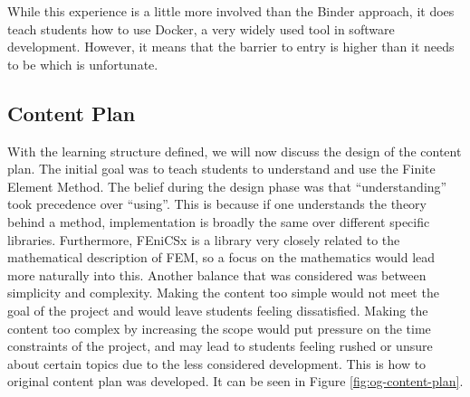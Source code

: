 While this experience is a little more involved than the Binder approach, it does teach students how to use Docker, a very widely used tool in software development. However, it means that the barrier to entry is higher than it needs to be which is unfortunate.

\subsection{Content Plan}


With the learning structure defined, we will now discuss the design of the content plan. The initial goal was to teach students to understand and use the Finite Element Method. The belief during the design phase was that ``understanding'' took precedence over ``using''. This is because if one understands the theory behind a method, implementation is broadly the same over different specific libraries. Furthermore, FEniCSx is a library very closely related to the mathematical description of FEM, so a focus on the mathematics would lead more naturally into this. Another balance that was considered was between simplicity and complexity. Making the content too simple would not meet the goal of the project and would leave students feeling dissatisfied. Making the content too complex by increasing the scope would put pressure on the time constraints of the project, and may lead to students feeling rushed or unsure about certain topics due to the less considered development. This is how to original content plan was developed. It can be seen in Figure \ref{fig:og-content-plan}.

